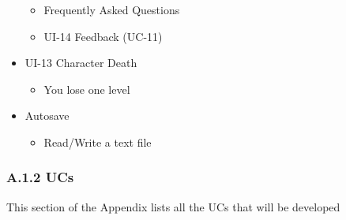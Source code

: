 \documentclass[12pt]{report}
\renewcommand{\_}{\kern-1.5pt\textunderscore\kern-1.5pt}
\begin{document}
\begin{itemize}
\begin{itemize}
	\item Frequently Asked Questions\par

	\item UI-14 Feedback (UC-11)\par


\end{itemize}
	\item UI-13 Character Death\par

\begin{itemize}
	\item You lose one level\par


\end{itemize}
	\item Autosave\par

\begin{itemize}
	\item Read/Write a text file
\end{itemize}\par
\end{itemize}

\vspace{\baselineskip}
\subsubsection*{A.1.2 UCs}
This section of the Appendix lists all the UCs that will be developed \par
\end{document}
